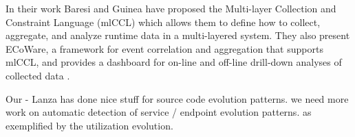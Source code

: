 In their work Baresi and Guinea have proposed the Multi-layer Collection and Constraint Language (mlCCL) which allows them to define how to collect, aggregate, and analyze runtime data in a multi-layered system. They also present ECoWare, a framework for event correlation and aggregation that supports mlCCL, and provides a dashboard for on-line and off-line drill-down analyses of collected data \cite{Bare13-monitoring}.

Our 
- Lanza has done nice stuff for source code evolution patterns. we need more work on automatic detection of service / endpoint evolution patterns. as exemplified by the utilization evolution.




